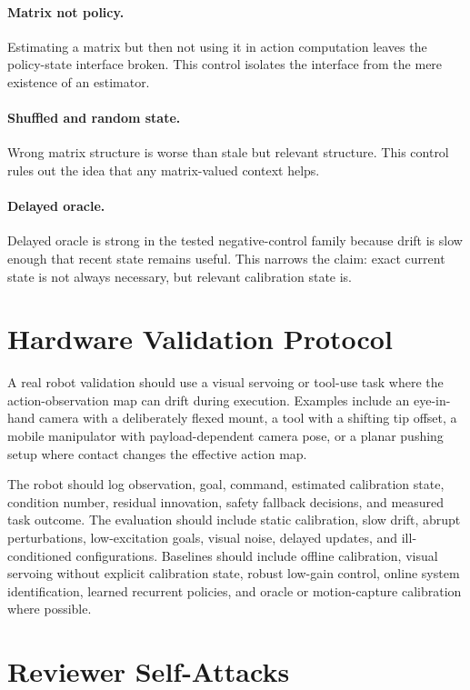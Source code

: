\documentclass{article}
\begin{document}
\paragraph{Matrix not policy.}
Estimating a matrix but then not using it in action computation leaves the
policy-state interface broken. This control isolates the interface from the
mere existence of an estimator.

\paragraph{Shuffled and random state.}
Wrong matrix structure is worse than stale but relevant structure. This control
rules out the idea that any matrix-valued context helps.

\paragraph{Delayed oracle.}
Delayed oracle is strong in the tested negative-control family because drift is
slow enough that recent state remains useful. This narrows the claim: exact
current state is not always necessary, but relevant calibration state is.

\section{Hardware Validation Protocol}

A real robot validation should use a visual servoing or tool-use task where the
action-observation map can drift during execution. Examples include an
eye-in-hand camera with a deliberately flexed mount, a tool with a shifting
tip offset, a mobile manipulator with payload-dependent camera pose, or a
planar pushing setup where contact changes the effective action map.

The robot should log observation, goal, command, estimated calibration state,
condition number, residual innovation, safety fallback decisions, and measured
task outcome. The evaluation should include static calibration, slow drift,
abrupt perturbations, low-excitation goals, visual noise, delayed updates, and
ill-conditioned configurations. Baselines should include offline calibration,
visual servoing without explicit calibration state, robust low-gain control,
online system identification, learned recurrent policies, and oracle or
motion-capture calibration where possible.

\section{Reviewer Self-Attacks}
\end{document}

